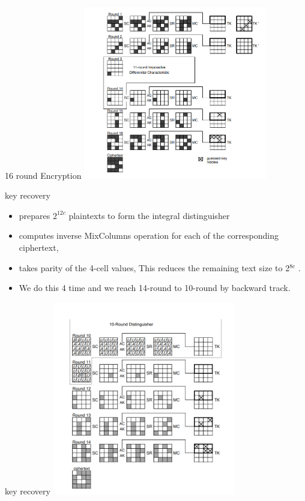 \begin{frame}{16 round Encryption}
	\centering
	\includegraphics[width=8cm]{02.PNG}
	
\end{frame}
\begin{frame}{key recovery}
	
	\begin{itemize}[<+->]
		\item  prepares 
		$ 2^{12c}$
		plaintexts to form the integral distinguisher
		\item computes inverse MixColumns operation for each of the corresponding ciphertext,\\
		\item takes parity of the 4-cell values, This
		reduces the remaining text size to 2$^{8c}$
		.
		
		\item We do this 4 time and we reach 14-round to 10-round by backward track.
	\end{itemize}
\end{frame}
\begin{frame}{key recovery}
	\centering
	\includegraphics[width=8cm]{!!.PNG}
\end{frame}
